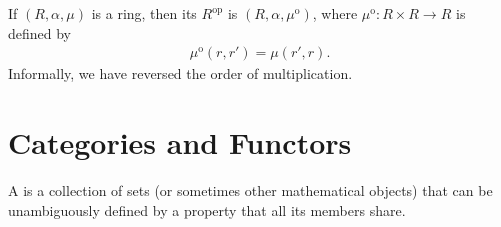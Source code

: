     \begin{definition}\label{def:opposite-ring}
        If $(R,\alpha,\mu)$ is a ring, then its  $R^{\text{op}}$ is $(R, \alpha, \mu^\text{o})$, where $\mu^{\text{o}}: R \times R \rightarrow R$ is defined by 
            \begin{equation*}
            \begin{split}
                \mu^{\text{o}}(r,r') = \mu(r',r).
            \end{split}
            \end{equation*}
        Informally, we have reversed the order of multiplication.
    \end{definition}
\section{Categories and Functors}\label{sec:categories-and-functors}
    \begin{definition}\label{def:class}
        A  is a collection of sets (or sometimes other mathematical objects) that can be unambiguously defined by a property that all its members share.
    \end{definition}


